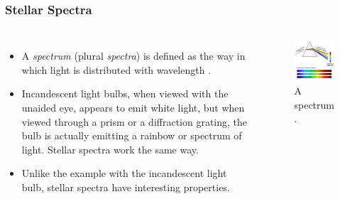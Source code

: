 \documentclass[aspectratio=169]{beamer}
\begin{document}
\begin{frame}
\frametitle{Stellar Spectra}

  \begin{block}

    \begin{columns}[t]

\vspace{-1cm} 
	\begin{itemize}
	\item A \textit{spectrum} (plural \textit{spectra}) is defined as the way in which light is distributed with wavelength \cite{Chromey}. 

	\item Incandescent light bulbs, when viewed with the unaided eye, appears to emit white light, but when viewed through a prism or a diffraction grating, the bulb is actually emitting a rainbow or spectrum of light. Stellar spectra work the same way. 
	\item Unlike the example with the incandescent light bulb, stellar spectra have interesting properties. 
	\end{itemize}
        \begin{figure}[T]
	 \vspace{-1cm} 
            \centering
            \includegraphics[width=2.0in]{spectrum.jpg}
            \caption{A spectrum \cite{spectrum}.}
            \label{fig:spectrum}
        \end{figure}

    \end{columns}
  \end{block}

\end{frame}
\end{document}
